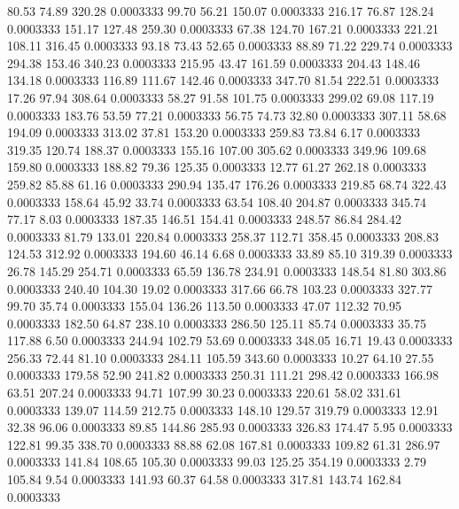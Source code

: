   80.53   74.89  320.28   0.0003333
  99.70   56.21  150.07   0.0003333
 216.17   76.87  128.24   0.0003333
 151.17  127.48  259.30   0.0003333
  67.38  124.70  167.21   0.0003333
 221.21  108.11  316.45   0.0003333
  93.18   73.43   52.65   0.0003333
  88.89   71.22  229.74   0.0003333
 294.38  153.46  340.23   0.0003333
 215.95   43.47  161.59   0.0003333
 204.43  148.46  134.18   0.0003333
 116.89  111.67  142.46   0.0003333
 347.70   81.54  222.51   0.0003333
  17.26   97.94  308.64   0.0003333
  58.27   91.58  101.75   0.0003333
 299.02   69.08  117.19   0.0003333
 183.76   53.59   77.21   0.0003333
  56.75   74.73   32.80   0.0003333
 307.11   58.68  194.09   0.0003333
 313.02   37.81  153.20   0.0003333
 259.83   73.84    6.17   0.0003333
 319.35  120.74  188.37   0.0003333
 155.16  107.00  305.62   0.0003333
 349.96  109.68  159.80   0.0003333
 188.82   79.36  125.35   0.0003333
  12.77   61.27  262.18   0.0003333
 259.82   85.88   61.16   0.0003333
 290.94  135.47  176.26   0.0003333
 219.85   68.74  322.43   0.0003333
 158.64   45.92   33.74   0.0003333
  63.54  108.40  204.87   0.0003333
 345.74   77.17    8.03   0.0003333
 187.35  146.51  154.41   0.0003333
 248.57   86.84  284.42   0.0003333
  81.79  133.01  220.84   0.0003333
 258.37  112.71  358.45   0.0003333
 208.83  124.53  312.92   0.0003333
 194.60   46.14    6.68   0.0003333
  33.89   85.10  319.39   0.0003333
  26.78  145.29  254.71   0.0003333
  65.59  136.78  234.91   0.0003333
 148.54   81.80  303.86   0.0003333
 240.40  104.30   19.02   0.0003333
 317.66   66.78  103.23   0.0003333
 327.77   99.70   35.74   0.0003333
 155.04  136.26  113.50   0.0003333
  47.07  112.32   70.95   0.0003333
 182.50   64.87  238.10   0.0003333
 286.50  125.11   85.74   0.0003333
  35.75  117.88    6.50   0.0003333
 244.94  102.79   53.69   0.0003333
 348.05   16.71   19.43   0.0003333
 256.33   72.44   81.10   0.0003333
 284.11  105.59  343.60   0.0003333
  10.27   64.10   27.55   0.0003333
 179.58   52.90  241.82   0.0003333
 250.31  111.21  298.42   0.0003333
 166.98   63.51  207.24   0.0003333
  94.71  107.99   30.23   0.0003333
 220.61   58.02  331.61   0.0003333
 139.07  114.59  212.75   0.0003333
 148.10  129.57  319.79   0.0003333
  12.91   32.38   96.06   0.0003333
  89.85  144.86  285.93   0.0003333
 326.83  174.47    5.95   0.0003333
 122.81   99.35  338.70   0.0003333
  88.88   62.08  167.81   0.0003333
 109.82   61.31  286.97   0.0003333
 141.84  108.65  105.30   0.0003333
  99.03  125.25  354.19   0.0003333
   2.79  105.84    9.54   0.0003333
 141.93   60.37   64.58   0.0003333
 317.81  143.74  162.84   0.0003333
